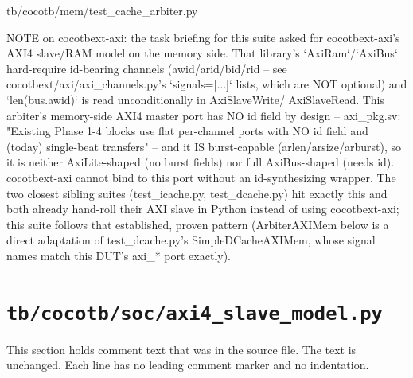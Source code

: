 \begin{relocated}{tb/cocotb/mem/test_cache_arbiter.py}
\begin{textblock}
NOTE on cocotbext-axi: the task briefing for this suite asked for
cocotbext-axi's AXI4 slave/RAM model on the memory side. That library's
`AxiRam`/`AxiBus` hard-require id-bearing channels (awid/arid/bid/rid --
see cocotbext/axi/axi_channels.py's `signals=[...]` lists, which are NOT
optional) and `len(bus.awid)` is read unconditionally in AxiSlaveWrite/
AxiSlaveRead. This arbiter's memory-side AXI4 master port has NO id field
by design -- axi_pkg.sv: "Existing Phase 1-4 blocks use flat per-channel
ports with NO id field and (today) single-beat transfers" -- and it IS
burst-capable (arlen/arsize/arburst), so it is neither AxiLite-shaped (no
burst fields) nor full AxiBus-shaped (needs id). cocotbext-axi cannot bind
to this port without an id-synthesizing wrapper. The two closest sibling
suites (test_icache.py, test_dcache.py) hit exactly this and both already
hand-roll their AXI slave in Python instead of using cocotbext-axi; this
suite follows that established, proven pattern (ArbiterAXIMem below is a
direct adaptation of test_dcache.py's SimpleDCacheAXIMem, whose signal
names match this DUT's axi_* port exactly).
\end{textblock}

\end{relocated}

\section{\texttt{tb/cocotb/soc/axi4\_slave\_model.py}}\label{tm:suite:soc-axi4-slave-model}

This section holds comment text that was in the source file. The text is unchanged. Each line has no leading comment marker and no indentation.


